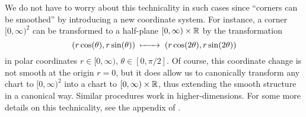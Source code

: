 We do not have to worry about this technicality in such cases since ``corners can be smoothed'' by introducing a new coordinate system. For instance, a corner $[0,\infty)^2$ can be transformed to a half-plane $[0,\infty)\times \mathbb{R}$ by the transformation
\[
	(r\cos(\theta), r\sin(\theta) )\lkxmapsto (r\cos(2\theta), r\sin(2\theta))
\]
in polar coordinates $r\in[0,\infty)$, $\theta\in [0,\pi/2]$. Of course, this coordinate change is not smooth at the origin $r=0$, but it does allow us to canonically transform any chart to $[0,\infty)^2$ into a chart to $[0,\infty)\times \mathbb{R}$, thus extending the smooth structure in a canonical way. Similar procedures work in higher-dimensions. For some more details on this technicality, see the appendix of \cite{milnor1958manifolds}.
